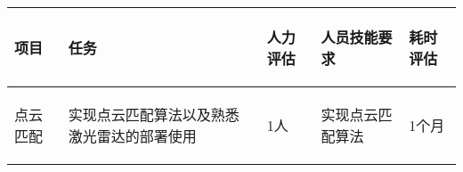 
\begin{longtable}{ p{2cm} | p{3cm} | p{3cm} | p{4.8cm} | p{2cm} |}

    \hline

    \endfoot
    
    \rowcolor{tabhdcolor}

        \begin{center}
            项目
        \end{center}  &
        \begin{center}
            任务
        \end{center}  &
        \begin{center}
           人力评估
        \end{center} &
        \begin{center}
            人员技能要求
        \end{center}  &
        \begin{center}
            耗时评估
        \end{center}  \\ 
        
    \hline

    \endhead

        \begin{center}
            点云匹配
        \end{center} &
        \begin{center}
            实现点云匹配算法以及熟悉激光雷达的部署使用
        \end{center} &
        \begin{center}
            1人
        \end{center} &
        \begin{center}
            实现点云匹配算法
        \end{center} &
        \begin{center}
            1个月
        \end{center}\\
        

\end{longtable}
